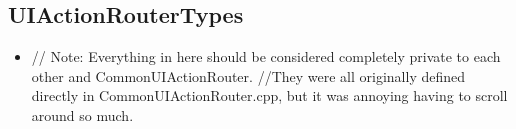         
        \subsection{UIActionRouterTypes}
            \begin{itemize}
                \item // Note: Everything in here should be considered completely private to each other and CommonUIActionRouter.
                //They were all originally defined directly in CommonUIActionRouter.cpp, but it was annoying having to scroll around so much.
            \end{itemize}

